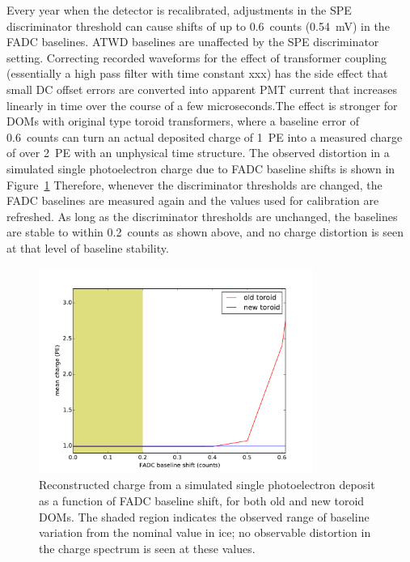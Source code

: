 Every year when the detector
is recalibrated, adjustments in the SPE discriminator threshold can
cause shifts of up to 0.6~counts (0.54~mV) in the FADC
baselines. ATWD baselines are unaffected by the SPE discriminator
setting. Correcting recorded waveforms for the effect of transformer
coupling (essentially a high pass filter with time constant xxx) has
the side effect that small DC offset errors are converted into
apparent PMT current that increases linearly in time over the course
of a few microseconds.The effect is stronger for DOMs with original
type toroid transformers, where a baseline error of 0.6~counts can
turn an actual deposited charge of 1~PE into a measured charge of over
2~PE with an unphysical time structure. The observed distortion in a
simulated single photoelectron charge due to FADC baseline shifts is
shown in Figure~\ref{fig:charge_fadcshift}  Therefore, whenever the
discriminator thresholds are changed, the FADC baselines are measured
again and the values used for calibration are refreshed. As long as
the discriminator thresholds are unchanged, the baselines are stable
to within 0.2~counts
as shown above, and no charge distortion is seen at that level of
baseline stability.

\begin{figure}[!h]
 \centering
 \includegraphics[width=0.8\textwidth]{graphics/dom/reliability/charge_fadcshift.pdf}
 \caption{Reconstructed charge from a simulated single photoelectron
   deposit as a function of FADC baseline shift, for both old and new
   toroid DOMs. The shaded region indicates the observed range of
   baseline variation from the nominal value in ice; no observable
   distortion in the charge spectrum is seen at these values.}
 \label{fig:charge_fadcshift}
\end{figure}

